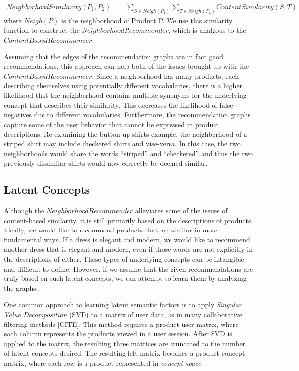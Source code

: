 \documentclass[11pt]{article}
\begin{document}
\begin{align}
NeighborhoodSimilarity(P_1, P_2) &= \sum\limits_{S\in
Neigh(P_1)}\sum\limits_{T\in Neigh(P_2)}
ContentSimilarity(S, T) 
\end{align}
where $Neigh(P)$ is the neighborhood of Product P. We use this similarity
function to construct the $Neighborhood Recommender$, which is analgous to the
$ContentBased Recommender$.

Assuming that the edges of the recommendation graphs are in fact good
recommendations, this approach can help both of the issues brought up with the
$ContentBased Recommender$. Since a neighborhood has many products, each 
describing themselves using potentially different vocabularies, there is a 
higher likelihood that the neighborhood contains multiple synonyms for the
underlying concept that describes their similarity. This decreases the
likelihood of false negatives due to different vocabularies. Furthermore,
the recommendation graphs capture some of the user behavior that cannot be
expressed in product descriptions. Re-examining the button-up shirts example, 
the neighborhood of a striped shirt may include checkered shirts and vise-versa.
In this case, the two neighborhoods would share the words ``striped'' and 
``checkered'' and thus the two previously dissimilar shirts would now correctly
be deemed similar.

\subsection*{Latent Concepts}
Although the $Neighborhood Recommender$ alleviates some of the issues of 
content-based similarity, it is still primarily based on the descriptions of
products. Ideally, we would like to recommend products that are similar in more
fundamental ways. If a dress is elegant and modern, we would like to recommend 
another dress that is elegant and modern, even if those words are not explicitly
in the descriptions of either. These types of underlying concepts can be 
intangible and difficult to define. However, if we assume that the given
recommendations are truly based on such latent concepts, we can attempt to learn 
them by analyzing the graphs.

One common approach to learning latent semantic factors is to apply {\em
Singular Value Decomposition} (SVD) to a matrix of user data, as in many 
collaborative filtering methods [CITE]. This method requires a product-user
matrix, where each column represents the products viewed in a user session.
After SVD is applied to the matrix, the resulting three matrices are truncated
to the number of latent concepts desired. The resulting left matrix becomes a
product-concept matrix, where each row is a product represented in 
{\em concept-space}
\end{document}
